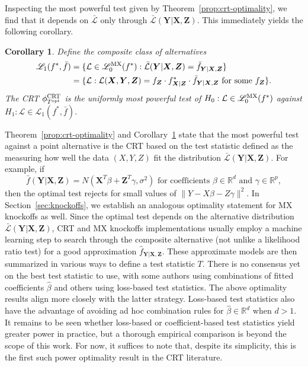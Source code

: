 \documentclass[12pt]{article}
\newtheorem{corollary}{Corollary}
\theoremstyle{definition}
\theoremstyle{remark}
\newcommand{\prx}{\bm X}
\newcommand{\srx}{X}
\newcommand{\prz}{\bm Z}
\newcommand{\srz}{Z}
\newcommand{\pry}{{\bm Y}}
\newcommand{\sry}{Y}
\def\CRT{\textnormal{CRT}}
\begin{document}
Inspecting the most powerful test given by Theorem~\ref{prop:crt-optimality}, we find that it depends on $\bar{\mathcal L}$ only through $\bar{\mathcal L}(\pry|\prx,\prz)$. This immediately yields the following corollary.
\begin{corollary} \label{cor:crt-optinality}
	Define the composite class of alternatives
	\begin{equation*}
	\begin{split}
	\mathscr L_1(f^*, \bar f) &= \{\mathcal L \in \mathscr L_0^{\textnormal{MX}}(f^*): \bar{\mathcal L}(\pry|\prx,\prz) = \bar f_{\pry|\prx,\prz}\} \\
	&= \{\mathcal L: \mathcal L(\prx,\pry,\prz) = f_{\prz} \cdot f^*_{\prx|\prz} \cdot \bar f_{\pry|\prx,\prz} \textnormal{ for some } f_{\prz}\}.
	\end{split}
	\end{equation*}
	The CRT $\phi^{\CRT}_{T^{\textnormal{opt}}}$ is the uniformly most powerful test of $H_0: \mathcal L \in \mathscr L_0^{\textnormal{MX}}(f^*)$ against $H_1: \mathcal L \in \mathscr L_1(f^*, \bar f)$.
\end{corollary}

Theorem~\ref{prop:crt-optimality} and Corollary~\ref{cor:crt-optinality} state that the most powerful test against a point alternative is the CRT based on the test statistic defined as the measuring how well the data $(\srx, \sry, \srz)$ fit the distribution $\bar{\mathcal L}(\pry|\prx,\prz)$. For example, if
\begin{equation}
\bar f(\pry|\prx,\prz) = N(\prx^T\beta + \prz^T \gamma, \sigma^2) \text{ for coefficients } \beta \in \mathbb R^d \text{ and } \gamma \in \mathbb R^p,
\label{linear-model}
\end{equation}
then the optimal test rejects for small values of $\|\sry - \srx \beta - \srz \gamma \|^2$. In Section~\ref{sec:knockoffs}, we establish an analogous optimality statement for MX knockoffs as well. Since the optimal test depends on the alternative distribution $\bar{\mathcal L}(\pry|\prx,\prz)$, CRT and MX knockoffs implementations usually employ a machine learning step to search through the composite alternative (not unlike a likelihood ratio test) for a good approximation $\widehat f_{\pry|\prx,\prz}$. These approximate models are then summarized in various ways to define a test statistic $T$. There is no consensus yet on the best test statistic to use, with some authors \cite{CetL16, SetC17, SetS19} using combinations of fitted coefficients $\widehat \beta$ and others  \cite{Tansey2018, Bates2020} using loss-based test statistics. The above optimality results align more closely with the latter strategy. Loss-based test statistics also have the advantage of avoiding ad hoc combination rules for $\widehat \beta \in \mathbb R^d$ when $d > 1$. 
It remains to be seen whether loss-based or coefficient-based test statistics yield greater power in practice, but a thorough empirical comparison is beyond the scope of this work. For now, it suffices to note that, despite its simplicity, this is the first such power optimality result in the CRT literature.
\end{document}
